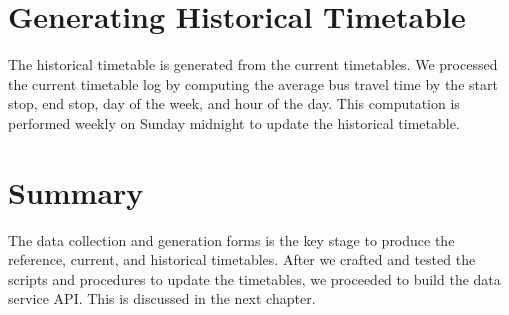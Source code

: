 \section{Generating Historical Timetable}
\label{sec:historical_timetable}
\par The historical timetable is generated from the current timetables. We processed the current timetable log by computing the average bus travel time by the start stop, end stop, day of the week, and hour of the day. This computation is performed weekly on Sunday midnight to update the historical timetable.


\section{Summary}
\par The data collection and generation forms is the key stage to produce the reference, current, and historical timetables. After we crafted and tested the scripts and procedures to update the timetables, we proceeded to build the data service API. This is discussed in the next chapter.
